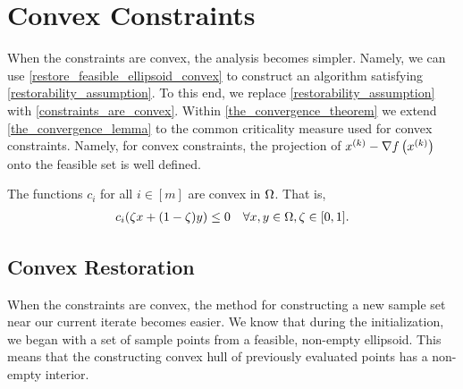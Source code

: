 \section{Convex Constraints}
When the constraints are convex, the analysis becomes simpler.
Namely, we can use \cref{restore_feasible_ellipsoid_convex} to construct an algorithm satisfying \cref{restorability_assumption}.
To this end, we replace \cref{restorability_assumption} with \cref{constraints_are_convex}.
Within \cref{the_convergence_theorem} we extend \cref{the_convergence_lemma} to the common criticality measure used for convex constraints.
Namely, for convex constraints, the projection of $x^{(k)} - \nabla f\left(x^{(k)}\right)$ onto the feasible set is well defined.


\begin{assumption}
\label{constraints_are_convex}
The functions $c_i$ for all $i \in [m]$ are convex in $ \Omega $. That is, 
\begin{align*}
c_i(\zeta x + (1 - \zeta) y) \le 0 \quad \forall x, y \in \Omega, \zeta \in [0, 1].
\end{align*}
\end{assumption}


\subsection{Convex Restoration}
\label{convex_restoration}
When the constraints are convex, the method for constructing a new sample set near our current iterate becomes easier.
We know that during the initialization, we began with a set of sample points from a feasible, non-empty ellipsoid.
This means that the constructing convex hull of previously evaluated points has a non-empty interior.




%             
% 

